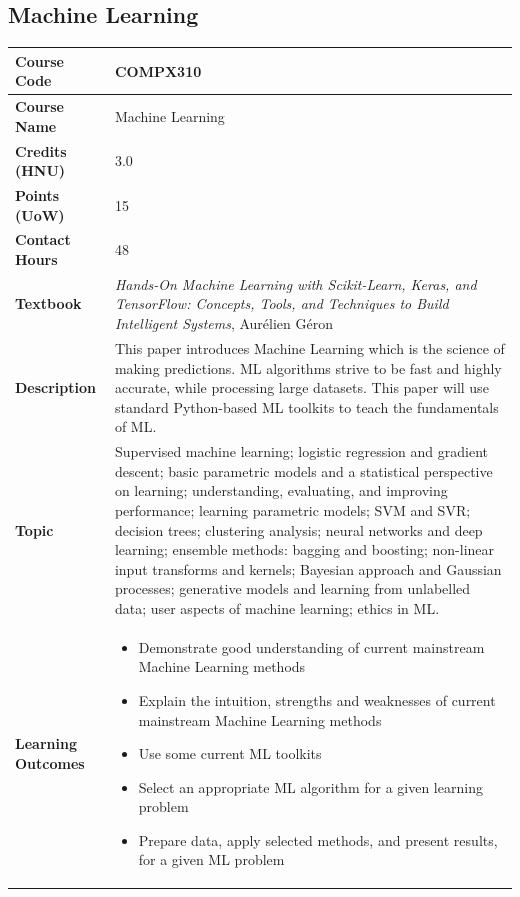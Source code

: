 \documentclass{article}
\begin{document}
\subsection[COMPX310 Machine Learning]{Machine Learning}
\renewcommand{\arraystretch}{1.5} %
\begin{longtable}{|p{3cm}|p{10cm}|}
\hline
\textbf{Course Code} & COMPX310 \\
\hline
\textbf{Course Name} & Machine Learning \\
\hline
\textbf{Credits (HNU)} & 3.0 \\
\hline
\textbf{Points (UoW)} & 15 \\
\hline
\textbf{Contact Hours} & 48 \\
\hline
\textbf{Textbook} & \emph{Hands-On Machine Learning with Scikit-Learn, Keras, and TensorFlow: Concepts, Tools, and Techniques to Build Intelligent Systems}, Aurélien Géron\\
\hline
\textbf{Description} & This paper introduces Machine Learning which is the science of making predictions. ML algorithms strive to be fast and highly accurate, while processing large datasets. This paper will use standard Python-based ML toolkits to teach the fundamentals of ML.\\
\hline
\textbf{Topic} & Supervised machine learning; logistic regression and gradient descent; basic parametric models and a statistical perspective on learning; understanding, evaluating, and improving performance; learning parametric models; SVM and SVR; decision trees; clustering analysis; neural networks and deep learning; ensemble methods: bagging and boosting; non-linear input transforms and kernels; Bayesian approach and Gaussian processes; generative models and learning from unlabelled data; user aspects of machine learning; ethics in ML.\\
\hline
\textbf{Learning Outcomes} & 
    \begin{itemize}
        \item Demonstrate good understanding of current mainstream Machine Learning methods
        \item Explain the intuition, strengths and weaknesses of current mainstream Machine Learning methods
        \item Use some current ML toolkits
        \item Select an appropriate ML algorithm for a given learning problem
        \item Prepare data, apply selected methods, and present results, for a given ML problem
    \end{itemize} \\
\hline
\end{longtable}
\end{document}

